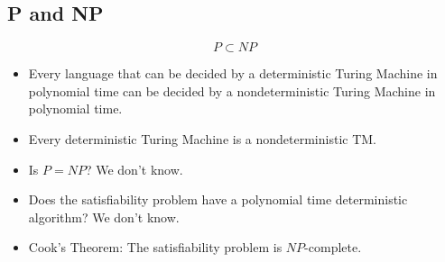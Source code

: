 \documentclass[a4paper]{article}
\begin{document}
\begin{multicols}{2}
	\section{P and NP}
	$$P \subset NP$$
	\begin{itemize}
		\item Every	language	that	can	be	decided	by	a	deterministic	Turing
		      Machine	in polynomial	time	can	be	decided	by	a	nondeterministic
		      Turing Machine	in polynomial	time.
		\item Every	deterministic	Turing Machine	is	a	nondeterministic	TM.
		\item Is $P = NP$? We don't know.
		\item Does the satisfiability problem have a polynomial time deterministic
		      algorithm? We don't know.
		\item Cook's Theorem: The satisfiability problem is $NP$-complete.
	\end{itemize}

\end{multicols}
\end{document}
